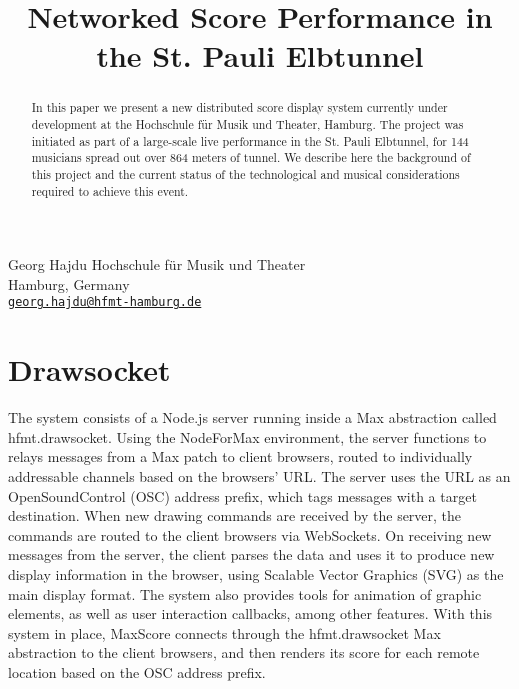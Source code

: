 

\def\papertitle{Networked Score Performance in the St. Pauli Elbtunnel}
\def\firstauthor{Georg Hajdu}
\def\secondauthor{Georg Hajdu}

\def\Hochschule{ Hochschule f\"ur Musik und Theater}

\title{\papertitle}
 \oneauthor
   {\firstauthor} {	
      Hochschule f\"ur Musik und Theater\\
         Hamburg, Germany \\ %
   \small{\tt \href{mailto:georg.hajdu@hfmt-hamburg.de}{georg.hajdu@hfmt-hamburg.de}}}





%

\capstartfalse
\maketitle
\capstarttrue
%
\begin{abstract}
In this paper we present a new distributed score display system currently under development at the Hochschule f\"ur Musik und Theater, Hamburg.
The project was initiated as part of a large-scale live performance in the St. Pauli Elbtunnel, for 144 musicians spread out over 864 meters of tunnel.
We describe here the background of this project and the current status of the technological and musical considerations required to achieve this event.

\end{abstract}



\section{Drawsocket}
The \drawsocket system consists of a Node.js server running inside a Max abstraction called hfmt.drawsocket.
Using the NodeForMax environment, the server functions to relays messages from a Max patch to client browsers, routed to individually addressable channels based on the browsers' URL.
The server uses the URL as an OpenSoundControl (OSC) address prefix, which tags messages with a target destination.
When new drawing commands are received by the server, the commands are routed to the client browsers via WebSockets.
On receiving new messages from the server, the client parses the data and uses it to produce new display information in the browser, using Scalable Vector Graphics (SVG) as the main display format.
The system also provides tools for animation of graphic elements, as well as user interaction callbacks, among other features.
With this system in place, MaxScore connects through the hfmt.drawsocket Max abstraction to the client browsers, and then renders its score for each remote location based on the OSC address prefix.


